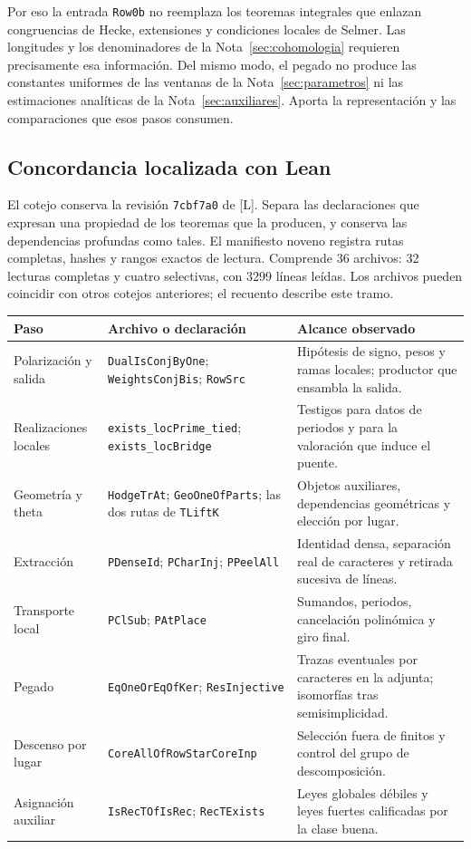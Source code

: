 Por eso la entrada \texttt{Row0b} no reemplaza los teoremas
integrales que enlazan congruencias de Hecke, extensiones y
condiciones locales de Selmer.
Las longitudes y los denominadores de la
Nota~\ref{sec:cohomologia} requieren precisamente esa información.
Del mismo modo, el pegado no produce las constantes uniformes
de las ventanas de la Nota~\ref{sec:parametros}
ni las estimaciones analíticas de la Nota~\ref{sec:auxiliares}.
Aporta la representación y las comparaciones que esos pasos consumen.

\subsection{Concordancia localizada con Lean}
\label{subsec:gal-lean}

El cotejo conserva la revisión \texttt{7cbf7a0} de [L].
Separa las declaraciones que expresan una propiedad de los
teoremas que la producen, y conserva las dependencias profundas
como tales. El manifiesto noveno registra rutas completas,
hashes y rangos exactos de lectura.
Comprende 36 archivos: 32 lecturas completas y cuatro selectivas,
con 3299 líneas leídas. Los archivos pueden coincidir con otros
cotejos anteriores; el recuento describe este tramo.

\begin{center}
\small
\begin{tabularx}{\textwidth}{@{}p{}YY@{}}
\toprule
Paso & Archivo o declaración & Alcance observado\\
\midrule
Polarización y salida &
\texttt{DualIsConjByOne}; \texttt{WeightsConjBis}; \texttt{RowSrc} &
Hipótesis de signo, pesos y ramas locales; productor que ensambla la salida.\\
Realizaciones locales &
\texttt{exists\_locPrime\_tied}; \texttt{exists\_locBridge} &
Testigos para datos de periodos y para la valoración que induce el puente.\\
Geometría y theta &
\texttt{HodgeTrAt}; \texttt{GeoOneOfParts};
las dos rutas de \texttt{TLiftK} &
Objetos auxiliares, dependencias geométricas y elección por lugar.\\
Extracción &
\texttt{PDenseId}; \texttt{PCharInj}; \texttt{PPeelAll} &
Identidad densa, separación real de caracteres y retirada sucesiva de líneas.\\
Transporte local &
\texttt{PClSub}; \texttt{PAtPlace} &
Sumandos, periodos, cancelación polinómica y giro final.\\
Pegado &
\texttt{EqOneOrEqOfKer}; \texttt{ResInjective} &
Trazas eventuales por caracteres en la adjunta; isomorfías tras semisimplicidad.\\
Descenso por lugar &
\texttt{CoreAllOfRowStarCoreInp} &
Selección fuera de finitos y control del grupo de descomposición.\\
Asignación auxiliar &
\texttt{IsRecTOfIsRec}; \texttt{RecTExists} &
Leyes globales débiles y leyes fuertes calificadas por la clase buena.\\
\bottomrule
\end{tabularx}
\end{center}

